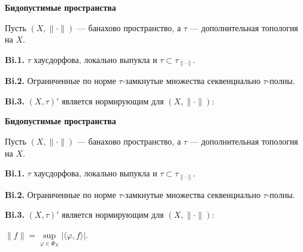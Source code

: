 \documentclass[11pt]{article}
\let\ph\varphi
\begin{document}
\begin{center}
{\color{notaeYELLOW}\bfseries\fontsize{44}{52}\selectfont Бидопустимые пространства}
\end{center}
\vspace*{\fill}
\begin{center}
\fontsize{36}{43}\selectfont
\parbox{\linewidth}{\centering\noindent Пусть $(X,\|\cdot\|)$ --- банахово пространство, а $\tau$ --- дополнительная топология на $X$.
\par}\vspace{0.4in}
\parbox{\linewidth}{\centering\noindent \textbf{Bi.1.} $\tau$ хаусдорфова, локально выпукла и $\tau\subset\tau_{\|\cdot\|}$.
\par}\vspace{0.4in}
\parbox{\linewidth}{\centering\noindent \textbf{Bi.2.} Ограниченные по норме $\tau$-замкнутые множества секвенциально $\tau$-полны.
\par}\vspace{0.4in}
\parbox{\linewidth}{\centering\noindent \textbf{Bi.3.} $(X,\tau)'$ является нормирующим для $(X,\|\cdot\|)$:
\par}\vspace{0.4in}
\end{center}
\vspace*{\fill}

\newpage

\begin{center}
{\color{notaeYELLOW}\bfseries\fontsize{44}{52}\selectfont Бидопустимые пространства}
\end{center}
\vspace*{\fill}
\begin{center}
\fontsize{36}{43}\selectfont
\parbox{\linewidth}{\centering\noindent Пусть $(X,\|\cdot\|)$ --- банахово пространство, а $\tau$ --- дополнительная топология на $X$.
\par}\vspace{0.4in}
\parbox{\linewidth}{\centering\noindent \textbf{Bi.1.} $\tau$ хаусдорфова, локально выпукла и $\tau\subset\tau_{\|\cdot\|}$.
\par}\vspace{0.4in}
\parbox{\linewidth}{\centering\noindent \textbf{Bi.2.} Ограниченные по норме $\tau$-замкнутые множества секвенциально $\tau$-полны.
\par}\vspace{0.4in}
\parbox{\linewidth}{\centering\noindent \textbf{Bi.3.} $(X,\tau)'$ является нормирующим для $(X,\|\cdot\|)$:
\par}\vspace{0.4in}
\parbox{\linewidth}{\centering\noindent $\|f\|=\sup\limits_{\ph\in\Phi_X}|\langle\ph,f\rangle|.$
\par}\vspace{0.4in}
\end{center}
\vspace*{\fill}
\end{document}
